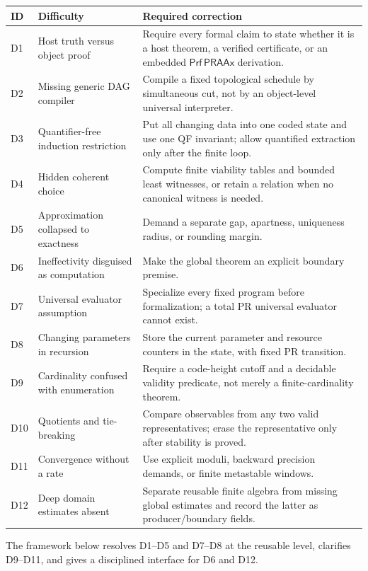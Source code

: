 \documentclass[11pt]{article}
\newcommand{\PRAAx}{\mathsf{PRAAx}}
\newcommand{\Prf}{\mathsf{Prf}}
\begin{document}
\begin{longtable}{p{}p{}p{}}
\toprule
ID & Difficulty & Required correction \\
\midrule
\endhead
D1 & Host truth versus object proof & Require every formal claim to state
whether it is a host theorem, a verified certificate, or an embedded
\(\Prf\,\PRAAx\) derivation. \\
D2 & Missing generic DAG compiler & Compile a fixed topological schedule by
simultaneous cut, not by an object-level universal interpreter. \\
D3 & Quantifier-free induction restriction & Put all changing data into one
coded state and use one QF invariant; allow quantified extraction only after
the finite loop. \\
D4 & Hidden coherent choice & Compute finite viability tables and bounded least
witnesses, or retain a relation when no canonical witness is needed. \\
D5 & Approximation collapsed to exactness & Demand a separate gap, apartness,
uniqueness radius, or rounding margin. \\
D6 & Ineffectivity disguised as computation & Make the global theorem an
explicit boundary premise. \\
D7 & Universal evaluator assumption & Specialize every fixed program before
formalization; a total PR universal evaluator cannot exist. \\
D8 & Changing parameters in recursion & Store the current parameter and
resource counters in the state, with fixed PR transition. \\
D9 & Cardinality confused with enumeration & Require a code-height cutoff and
a decidable validity predicate, not merely a finite-cardinality theorem. \\
D10 & Quotients and tie-breaking & Compare observables from any two valid
representatives; erase the representative only after stability is proved. \\
D11 & Convergence without a rate & Use explicit moduli, backward precision
demands, or finite metastable windows. \\
D12 & Deep domain estimates absent & Separate reusable finite algebra from
missing global estimates and record the latter as producer/boundary fields. \\
\bottomrule
\end{longtable}

The framework below resolves D1--D5 and D7--D8 at the reusable level, clarifies
D9--D11, and gives a disciplined interface for D6 and D12.
\end{document}
